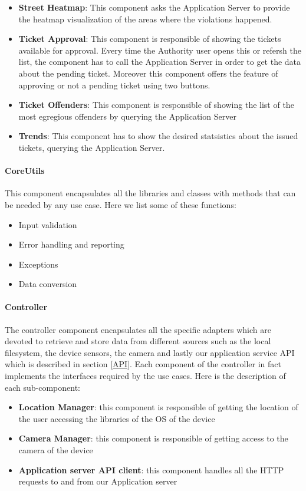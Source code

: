 \begin{itemize}
  \item \textbf{Street Heatmap}: This component asks the Application Server to provide the heatmap visualization of the areas where the violations happened.
  \item \textbf{Ticket Approval}: This component is responsible of showing the tickets available for approval. Every time the Authority user opens this or refersh the list, the component has to call the Application Server in order to get the data about the pending ticket. Moreover this component offers the feature of approving or not a pending ticket using two buttons.
  \item \textbf{Ticket Offenders}: This component is responsible of showing the list of the most egregious offenders by querying the Application Server
  \item \textbf{Trends}: This component has to show the desired statsistics about the issued tickets, querying the Application Server.
\end{itemize}

\paragraph{CoreUtils}
This component encapsulates all the libraries and classes with methods that can be needed by any use case.
Here we list some of these functions:
\begin{itemize}
  \item Input validation
  \item Error handling and reporting
  \item Exceptions
  \item Data conversion
\end{itemize}

\paragraph{Controller}
The controller component encapsulates all the specific adapters which are devoted to retrieve and store data from different sources such as the local filesystem, the device sensors, the camera and lastly our application service API which is described in section \ref{API}.
Each component of the controller in fact implements the interfaces required by the use cases.
Here is the description of each sub-component:
\begin{itemize}
  \item \textbf{Location Manager}: this component is responsible of getting the location of the user accessing the libraries of the OS of the device
  \item \textbf{Camera Manager}: this component is responsible of getting access to the camera of the device
  \item \textbf{Application server API client}: this component handles all the HTTP requests to and from our Application server
\end{itemize}

